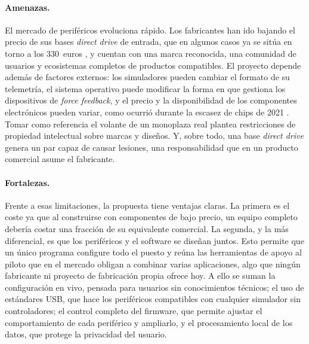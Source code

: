 \paragraph{Amenazas.}
El mercado de periféricos evoluciona rápido. Los fabricantes han ido bajando el precio de sus bases \textit{direct drive} de entrada, que en algunos casos ya se sitúa en torno a los 330~euros \parencite{fanatec_web}, y cuentan con una marca reconocida, una comunidad de usuarios y ecosistemas completos de productos compatibles. El proyecto depende además de factores externos: los simuladores pueden cambiar el formato de su telemetría, el sistema operativo puede modificar la forma en que gestiona los dispositivos de \textit{force feedback}, y el precio y la disponibilidad de los componentes electrónicos pueden variar, como ocurrió durante la escasez de chips de 2021 \parencite{endor_web}. Tomar como referencia el volante de un monoplaza real plantea restricciones de propiedad intelectual sobre marcas y diseños. Y, sobre todo, una base \textit{direct drive} genera un par capaz de causar lesiones, una responsabilidad que en un producto comercial asume el fabricante.

\paragraph{Fortalezas.}
Frente a esas limitaciones, la propuesta tiene ventajas claras. La primera es el coste ya que al construirse con componentes de bajo precio, un equipo completo debería costar una fracción de su equivalente comercial. La segunda, y la más diferencial, es que los periféricos y el software se diseñan juntos. Esto permite que un único programa configure todo el puesto y reúna las herramientas de apoyo al piloto que en el mercado obligan a combinar varias aplicaciones, algo que ningún fabricante ni proyecto de fabricación propia ofrece hoy. A ello se suman la configuración en vivo, pensada para usuarios sin conocimientos técnicos; el uso de estándares USB, que hace los periféricos compatibles con cualquier simulador sin controladores; el control completo del firmware, que permite ajustar el comportamiento de cada periférico y ampliarlo, y el procesamiento local de los datos, que protege la privacidad del usuario.

